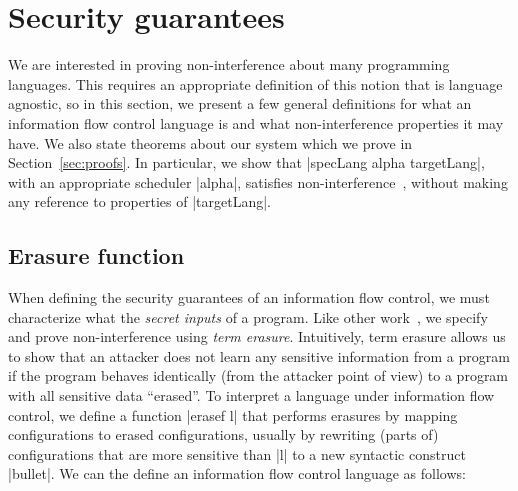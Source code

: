 \section{Security guarantees}
\label{sec:formal}

We are interested in proving non-interference about many programming
languages.  This requires an appropriate definition of this notion
that is language agnostic, so in this section, we present a few
general definitions for what an information flow control language is
and what non-interference properties it may have.  We also state
theorems about our system which we prove in Section~\ref{sec:proofs}.
In particular, we show that |specLang alpha targetLang|, with an appropriate
scheduler |alpha|, satisfies non-interference~\cite{Goguen82},
without making any reference to properties of |targetLang|.


\subsection{Erasure function}

When defining the security guarantees of an information flow control,
we must characterize what the \emph{secret inputs} of a program.  Like
other work~\cite{Li+:2010:arrows,Russo+:Haskell08,lio,stefan:addressing-covert},
we specify and prove non-interference using \emph{term erasure}.
%
Intuitively, term erasure allows us to show that an attacker does not learn
any sensitive information from a program if the program behaves identically
(from the attacker point of view) to a program with all sensitive data
``erased''.
%
To interpret a language under information flow control, we define a function |erasef l| that
performs erasures by mapping configurations to erased configurations,
usually by rewriting (parts of) configurations that are more sensitive
than |l| to a new syntactic construct |bullet|.  We can the define
an information flow control language as follows:


